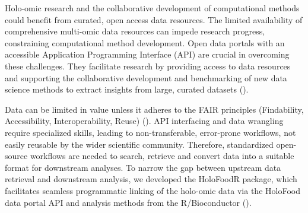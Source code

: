 \documentclass[unnumsec,webpdf,namedate,modern,large]{oup-authoring-template}%
\begin{document}


Holo-omic research and the collaborative development of computational methods could benefit from curated, open access data resources.
The limited availability of comprehensive multi-omic data resources can impede research progress, constraining computational method development. Open data portals with an accessible Application Programming Interface (API) are crucial in overcoming these challenges. They facilitate research by providing access to data resources and supporting the collaborative development and benchmarking of new data science methods to extract insights from large, curated datasets (\cite{pasolli_2017}).

Data can be limited in value unless it adheres to the FAIR principles (Findability, Accessibility, Interoperability, Reuse) (\cite{wilkinsonFAIRGuidingPrinciples2016}). API interfacing and data wrangling require specialized skills, leading to non-transferable, error-prone workflows, not easily reusable by the wider scientific community. Therefore, standardized open-source workflows are needed to search, retrieve and convert data into a suitable format for downstream analyses.
To narrow the gap between upstream data retrieval and downstream analysis, we developed the HoloFoodR package, which facilitates seamless programmatic linking of the holo-omic data via the HoloFood data portal API and analysis methods from the R/Bioconductor  (\cite{gentleman_bioconductor_2004,callahan_bioconductor_2016}).
\end{document}
